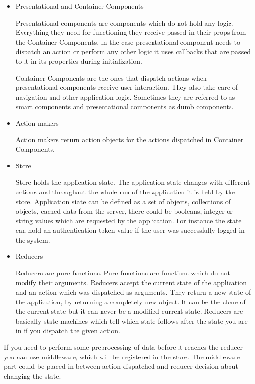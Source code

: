 \documentclass[thesis=M,english]{FITthesis}[2012/10/20]
\begin{document}
\begin{itemize}
\item{Presentational and Container Components}

Presentational components are components which do not hold any logic. Everything they need for functioning they receive passed in their props from the Container Components. In the case presentational component needs to dispatch an action or perform any other logic it uses callbacks that are passed to it in its properties during initialization.

Container Components are the ones that dispatch actions when presentational components receive user interaction. They also take care of navigation and other application logic. Sometimes they are referred to as smart components and presentational components as dumb components.

\item{Action makers}

Action makers return action objects for the actions dispatched in Container Components.

\item{Store}

Store holds the application state. The application state changes with different actions and throughout the whole run of the application it is held by the store. Application state can be defined as a set of objects, collections of objects, cached data from the server, there could be booleans, integer or string values which are requested by the application. For instance the state can hold an authentication token value if the user was successfully logged in the system.

\item{Reducers}

Reducers are pure functions. Pure functions are functions which do not modify their arguments. Reducers accept the current state of the application and an action which was dispatched as arguments. They return a new state of the application, by returning a completely new object. It can be the clone of the current state but it can never be a modified current state. Reducers are basically state machines which tell which state follows after the state you are in if you dispatch the given action.

\end{itemize}

If you need to perform some preprocessing of data before it reaches the reducer you can use middleware, which will be registered in the store. The middleware part could be placed in between action dispatched and reducer decision about changing the state.
\end{document}
